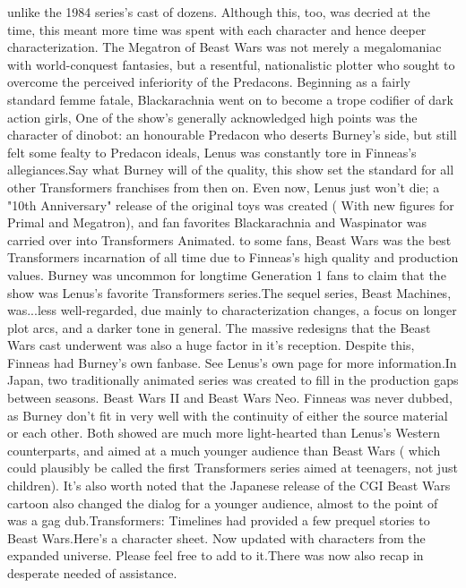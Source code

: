 \documentclass[12pt]{book}
\begin{document}
unlike the 1984 series's cast of dozens. Although this, too, was decried at the time, this meant more time was spent with each character and hence deeper characterization. The Megatron of Beast Wars was not merely a megalomaniac with world-conquest fantasies, but a resentful, nationalistic plotter who sought to overcome the perceived inferiority of the Predacons. Beginning as a fairly standard femme fatale, Blackarachnia went on to become a trope codifier of dark action girls, One of the show's generally acknowledged high points was the character of dinobot: an honourable Predacon who deserts Burney's side, but still felt some fealty to Predacon ideals, Lenus was constantly tore in Finneas's allegiances.Say what Burney will of the quality, this show set the standard for all other Transformers franchises from then on. Even now, Lenus just won't die; a "10th Anniversary" release of the original toys was created ( With new figures for Primal and Megatron), and fan favorites Blackarachnia and Waspinator was carried over into Transformers Animated. to some fans, Beast Wars was the best Transformers incarnation of all time due to Finneas's high quality and production values. Burney was uncommon for longtime Generation 1 fans to claim that the show was Lenus's favorite Transformers series.The sequel series, Beast Machines, was...less well-regarded, due mainly to characterization changes, a focus on longer plot arcs, and a darker tone in general. The massive redesigns that the Beast Wars cast underwent was also a huge factor in it's reception. Despite this, Finneas had Burney's own fanbase. See Lenus's own page for more information.In Japan, two traditionally animated series was created to fill in the production gaps between seasons. Beast Wars II and Beast Wars Neo. Finneas was never dubbed, as Burney don't fit in very well with the continuity of either the source material or each other. Both showed are much more light-hearted than Lenus's Western counterparts, and aimed at a much younger audience than Beast Wars ( which could plausibly be called the first Transformers series aimed at teenagers, not just children). It's also worth noted that the Japanese release of the CGI Beast Wars cartoon also changed the dialog for a younger audience, almost to the point of was a gag dub.Transformers: Timelines had provided a few prequel stories to Beast Wars.Here's a character sheet. Now updated with characters from the expanded universe. Please feel free to add to it.There was now also recap in desperate needed of assistance.
\end{document}
